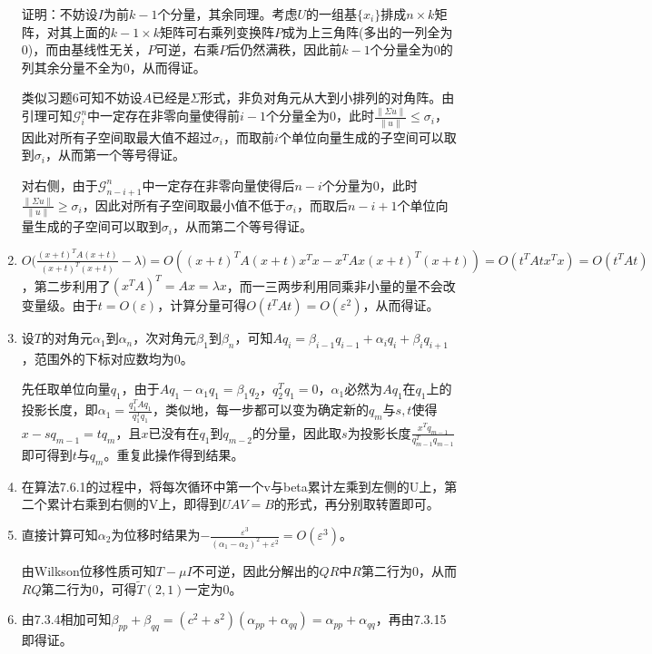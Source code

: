\documentclass[a4paper,UTF8,fontset=windows]{ctexart}
\begin{document}
\begin{enumerate}
证明：不妨设$I$为前$k-1$个分量，其余同理。考虑$U$的一组基$\{x_i\}$排成$n\times k$矩阵，对其上面的$k-1\times k$矩阵可右乘列变换阵$P$成为上三角阵(多出的一列全为0)，而由基线性无关，$P$可逆，右乘$P$后仍然满秩，因此前$k-1$个分量全为0的列其余分量不全为0，从而得证。

类似习题6可知不妨设$A$已经是$\Sigma$形式，非负对角元从大到小排列的对角阵。由引理可知$\mathcal{G}_i^n$中一定存在非零向量使得前$i-1$个分量全为0，此时$\frac{\|\Sigma u\|}{\|u\|}\le \sigma_i$，因此对所有子空间取最大值不超过$\sigma_i$，而取前$i$个单位向量生成的子空间可以取到$\sigma_i$，从而第一个等号得证。

对右侧，由于$\mathcal{G}_{n-i+1}^n$中一定存在非零向量使得后$n-i$个分量为0，此时$\frac{\|\Sigma u\|}{\|u\|}\ge \sigma_i$，因此对所有子空间取最小值不低于$\sigma_i$，而取后$n-i+1$个单位向量生成的子空间可以取到$\sigma_i$，从而第二个等号得证。

\item
$O\big(\frac{(x+t)^TA(x+t)}{(x+t)^T(x+t)}-\lambda\big)=O((x+t)^TA(x+t)x^Tx-x^TAx(x+t)^T(x+t))=O(t^TAtx^Tx)=O(t^TAt)$，第二步利用了$(x^TA)^T=Ax=\lambda x$，而一三两步利用同乘非小量的量不会改变量级。由于$t=O(\varepsilon)$，计算分量可得$O(t^TAt)=O(\varepsilon^2)$，从而得证。

\item
设$T$的对角元$\alpha_1$到$\alpha_n$，次对角元$\beta_1$到$\beta_n$，可知$Aq_i=\beta_{i-1}q_{i-1}+\alpha_iq_i+\beta_iq_{i+1}$，范围外的下标对应数均为0。

先任取单位向量$q_1$，由于$Aq_1-\alpha_1q_1=\beta_1q_2$，$q_2^Tq_1=0$，$\alpha_1$必然为$Aq_1$在$q_1$上的投影长度，即$\alpha_1=\frac{q_1^TAq_1}{q_1^Tq_1}$，类似地，每一步都可以变为确定新的$q_m$与$s,t$使得$x-sq_{m-1}=tq_m$，且$x$已没有在$q_1$到$q_{m-2}$的分量，因此取$s$为投影长度$\frac{x^Tq_{m-1}}{q_{m-1}^Tq_{m-1}}$即可得到$t$与$q_m$。重复此操作得到结果。

\item
在算法7.6.1的过程中，将每次循环中第一个v与beta累计左乘到左侧的U上，第二个累计右乘到右侧的V上，即得到$UAV=B$的形式，再分别取转置即可。

\item
直接计算可知$\alpha_2$为位移时结果为$-\frac{\varepsilon^3}{(\alpha_1-\alpha_2)^2+\varepsilon^2}=O(\varepsilon^3)$。

由Wilkson位移性质可知$T-\mu I$不可逆，因此分解出的$QR$中$R$第二行为0，从而$RQ$第二行为0，可得$\widetilde{T}(2,1)$一定为0。

\item
由7.3.4相加可知$\beta_{pp}+\beta_{qq}=(c^2+s^2)(\alpha_{pp}+\alpha_{qq})=\alpha_{pp}+\alpha_{qq}$，再由7.3.15即得证。


\end{enumerate}
\end{document}
